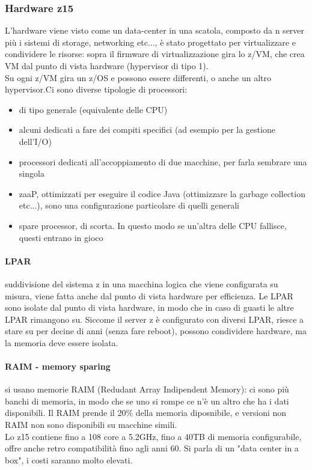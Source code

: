 \documentclass{article}
\begin{document}
\subsubsection{Hardware z15}
L'hardware viene visto come un data-center in una scatola, composto da n server più i sistemi di storage, networking etc..., è stato progettato per virtualizzare e condividere le risorse: sopra il firmware di virtualizzazione gira lo z/VM, che crea VM dal punto di vista hardware (hypervisor di tipo 1).\\ Su ogni z/VM gira un z/OS e possono essere differenti, o anche un altro hypervisor.Ci sono diverse tipologie di processori:
\begin{itemize}
\item di tipo generale (equivalente delle CPU)
\item alcuni dedicati a fare dei compiti specifici (ad esempio per la gestione dell'I/O)
\item processori dedicati all'accoppiamento di due macchine, per farla sembrare una singola
\item zaaP, ottimizzati per eseguire il codice Java (ottimizzare la garbage collection etc...), sono una configurazione particolare di quelli generali
\item spare processor, di scorta. In questo modo se un'altra delle CPU fallisce, questi entrano in gioco
\end{itemize}
\paragraph{LPAR}suddivisione del sistema z in una macchina logica che viene configurata su misura, viene fatta anche dal punto di vista hardware per efficienza. Le LPAR sono isolate dal punto di vista hardware, in modo che in caso di guasti le altre LPAR rimangono su. Siccome il server z è configurato con diversi LPAR, riesce a stare su per decine di anni (senza fare reboot), possono condividere hardware, ma la memoria deve essere isolata.\\
\paragraph{RAIM - memory sparing}si usano memorie RAIM (Redudant Array Indipendent Memory): ci sono più banchi di memoria, in modo che se uno si rompe ce n'è un altro che ha i dati disponibili. Il RAIM prende il 20\% della memoria diposnibile, e versioni non RAIM non sono disponibili su macchine simili.\\ Lo z15 contiene fino a 108 core a 5.2GHz, fino a 40TB di memoria configurabile, offre anche retro compatibilità fino agli anni 60. Si parla di un "data center in a box", i costi saranno molto elevati.
\end{document}
